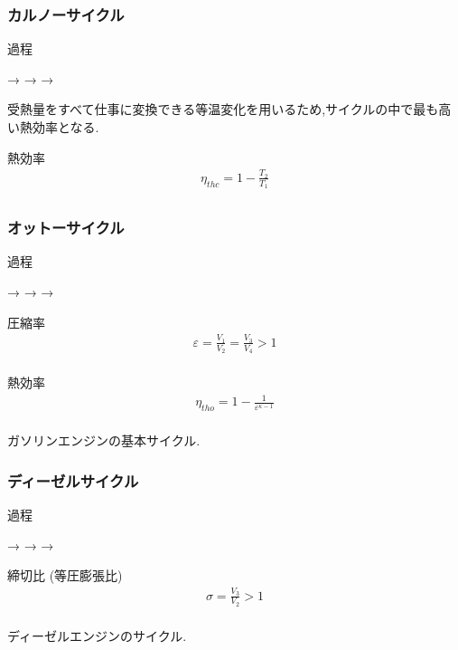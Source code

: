 \documentclass[a4paper]{jsarticle}
\begin{document}
\subsubsection{カルノーサイクル}
\begin{itembox}[l]{過程}
    \begin{center}
        \quad → \quad {} \quad → \quad {} \quad → \quad {}
    \end{center}
\end{itembox}
受熱量をすべて仕事に変換できる等温変化を用いるため,サイクルの中で最も高い熱効率となる.
\begin{itembox}[l]{熱効率}
    \begin{eqnarray*}
        \eta_{thc}=1-\frac{T_2}{T_1}\\
    \end{eqnarray*}
\end{itembox}
\subsubsection{オットーサイクル}
\begin{itembox}[l]{過程}
    \begin{center}
        \quad → \quad {} \quad → \quad {} \quad → \quad {}
    \end{center}
\end{itembox}
\begin{itembox}[l]{圧縮率}
    \begin{eqnarray*}
        \varepsilon=\frac{V_1}{V_2}=\frac{V_3}{V_4}> 1\\
    \end{eqnarray*}
\end{itembox}
\begin{itembox}[l]{熱効率}
    \begin{eqnarray*}
        \eta_{tho}=1-\frac{1}{\varepsilon^{\kappa-1}}\\
    \end{eqnarray*}
\end{itembox}
ガソリンエンジンの基本サイクル.
\subsubsection{ディーゼルサイクル}
\begin{itembox}[l]{過程}
    \begin{center}
        \quad → \quad {} \quad → \quad {} \quad → \quad {}
    \end{center}
\end{itembox}
\begin{itembox}[l]{締切比 (等圧膨張比)}
    \begin{eqnarray*}
        \sigma=\frac{V_3}{V_2}>1\\
    \end{eqnarray*}
\end{itembox}
ディーゼルエンジンのサイクル.
\end{document}
